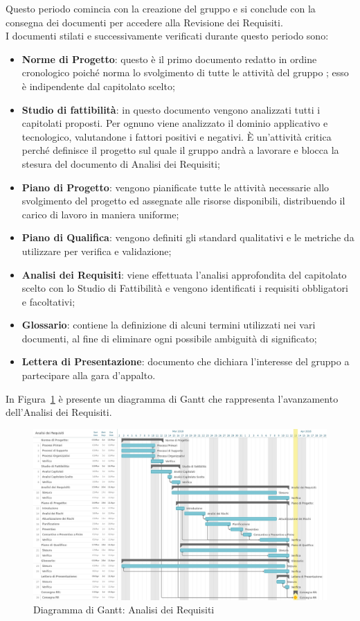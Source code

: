Questo periodo comincia con la creazione del gruppo e si conclude con la consegna dei documenti per accedere alla Revisione dei Requisiti.\\
I documenti stilati e successivamente verificati durante questo periodo sono:
\begin{itemize}
\item \textbf{Norme di Progetto}: questo è il primo documento redatto in ordine cronologico poiché norma lo svolgimento di tutte le attività del gruppo \Gruppo; esso è indipendente dal capitolato scelto;
\item \textbf{Studio di fattibilità}: in questo documento vengono analizzati tutti i capitolati proposti. Per ognuno viene analizzato il dominio applicativo e tecnologico, valutandone i fattori positivi e negativi. È un’attività critica perché definisce il progetto sul quale il gruppo andrà a lavorare e blocca la stesura del documento di Analisi dei Requisiti;
\item \textbf{Piano di Progetto}: vengono pianificate tutte le attività necessarie allo svolgimento del progetto ed assegnate alle risorse disponibili, distribuendo il carico di lavoro in maniera uniforme;
\item \textbf{Piano di Qualifica}: vengono definiti gli standard qualitativi e le metriche da utilizzare per verifica e validazione;
\item \textbf{Analisi dei Requisiti}: viene effettuata l’analisi approfondita del capitolato scelto con lo Studio di Fattibilità e vengono identificati i requisiti obbligatori e facoltativi;
\item \textbf{Glossario}: contiene la definizione di alcuni termini utilizzati nei vari documenti, al fine di eliminare ogni possibile ambiguità di significato;
\item \textbf{Lettera di Presentazione}: documento che dichiara l’interesse del gruppo a partecipare alla gara d’appalto.
\end{itemize}

In Figura~\ref{fig:gantt_ana_req} è presente un diagramma di Gantt che rappresenta l'avanzamento dell'Analisi dei Requisiti.

\begin{figure}[h!]
	\centerline{\includegraphics[scale=0.4]{img/DiagrammiGantt/AnalisiRequisiti.jpg}}
	\caption{Diagramma di Gantt: Analisi dei Requisiti}
	\label{fig:gantt_ana_req}
\end{figure}
\clearpage

